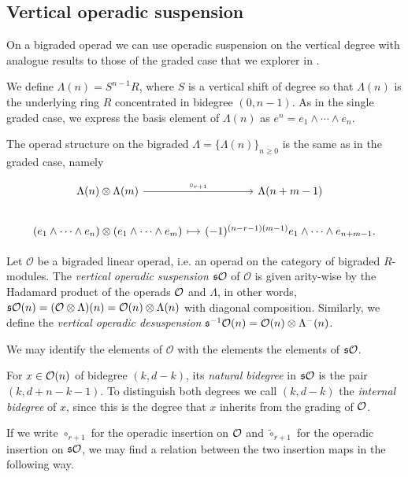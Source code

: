 \documentclass[Thesis.tex]{subfiles}
\begin{document}
\subsection{Vertical operadic suspension}\label{vertical}
On a bigraded operad we can use operadic suspension on the vertical degree with analogue results to those of the graded case that we explorer in .

We define $\Lambda(n)=S^{n-1}R$, where  $S$ is a vertical shift of degree so that $\Lambda(n)$ is the underlying ring $R$ concentrated in bidegree  $(0,n-1)$. As in the single graded case, we express the basis element of $\Lambda(n)$ as $e^n=e_1\land\cdots\land e_n$.

The operad structure on the bigraded $\Lambda=\{\Lambda(n)\}_{n\geq 0}$ is the same as in the graded case, namely

\[
\begin{tikzcd}[column sep = 1.2em]
\Lambda(n)\otimes\Lambda(m) \arrow[r, "\circ_{r+1}"] & \Lambda(n+m-1)\\
(e_1\land\cdots\land e_n)\otimes(e_1\land\cdots\land e_m)\arrow[r, mapsto] & (-1)^{(n-r-1)(m-1)}e_1\land\cdots\land e_{n+m-1}.
\end{tikzcd}
\]


\begin{defin}
Let $\mathcal{O}$ be a bigraded linear operad, i.e. an operad on the category of bigraded $R$-modules. The \emph{vertical operadic suspension} $\mathfrak{s}{\mathcal O}$ of $\mathcal{O}$ is given arity-wise by the Hadamard product of the operads ${\mathcal O}$ and $\Lambda$, in other words, $\mathfrak{s}{\mathcal O}(n)=(\mathcal{O}\otimes\Lambda)(n)=\mathcal{O}(n)\otimes\Lambda(n)$ with diagonal composition. Similarly, we define the \emph{vertical operadic desuspension} $\mathfrak{s}^{-1}{\mathcal O}(n)=\mathcal{O}(n)\otimes\Lambda^-(n)$.
\end{defin}


We may identify the elements of $\mathcal{O}$ with the elements the elements of $\mathfrak{s}{\mathcal O}$. 
\begin{defin}
For $x\in{\mathcal O}(n)$ of bidegree $(k,d-k)$, its \emph{natural bidegree} in $\mathfrak{s}{\mathcal O}$ is the pair $(k,d+n-k-1)$. To distinguish both degrees we call $(k,d-k)$ the \emph{internal bidegree} of $x$, since this is the degree that $x$ inherits from the grading of ${\mathcal O}$. 
\end{defin}

If we write $\circ_{r+1}$ for the operadic insertion on ${\mathcal O}$ and $\tilde{\circ}_{r+1}$ for the operadic insertion on $\mathfrak{s}{\mathcal O}$, we may find a relation between the two insertion maps in the following way. 
\end{document}

